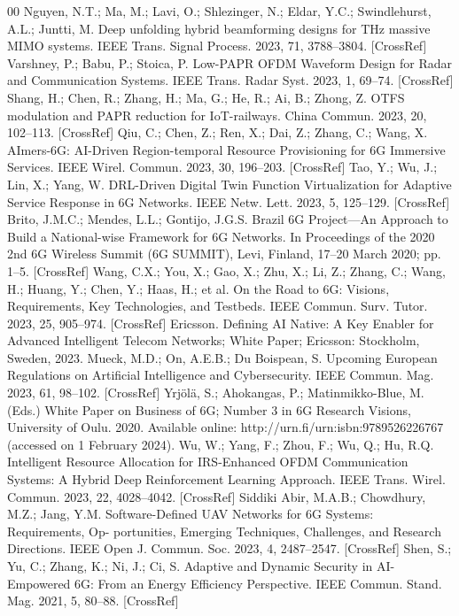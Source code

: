 \documentclass[conference]{IEEEtran}
\begin{document}
\begin{thebibliography}{00}
 Nguyen, N.T.; Ma, M.; Lavi, O.; Shlezinger, N.; Eldar, Y.C.; Swindlehurst, A.L.; Juntti, M. Deep unfolding hybrid beamforming designs for THz massive MIMO systems. IEEE Trans. Signal Process. 2023, 71, 3788–3804. [CrossRef]
 Varshney, P.; Babu, P.; Stoica, P. Low-PAPR OFDM Waveform Design for Radar and Communication Systems. IEEE Trans. Radar Syst. 2023, 1, 69–74. [CrossRef]
 Shang, H.; Chen, R.; Zhang, H.; Ma, G.; He, R.; Ai, B.; Zhong, Z. OTFS modulation and PAPR reduction for IoT-railways. China Commun. 2023, 20, 102–113. [CrossRef]
 Qiu, C.; Chen, Z.; Ren, X.; Dai, Z.; Zhang, C.; Wang, X. AImers-6G: AI-Driven Region-temporal Resource Provisioning for 6G Immersive Services. IEEE Wirel. Commun. 2023, 30, 196–203. [CrossRef]
 Tao, Y.; Wu, J.; Lin, X.; Yang, W. DRL-Driven Digital Twin Function Virtualization for Adaptive Service Response in 6G Networks. IEEE Netw. Lett. 2023, 5, 125–129. [CrossRef]
 Brito, J.M.C.; Mendes, L.L.; Gontijo, J.G.S. Brazil 6G Project—An Approach to Build a National-wise Framework for 6G Networks. In Proceedings of the 2020 2nd 6G Wireless Summit (6G SUMMIT), Levi, Finland, 17–20 March 2020; pp. 1–5. [CrossRef]
 Wang, C.X.; You, X.; Gao, X.; Zhu, X.; Li, Z.; Zhang, C.; Wang, H.; Huang, Y.; Chen, Y.; Haas, H.; et al. On the Road to 6G: Visions, Requirements, Key Technologies, and Testbeds. IEEE Commun. Surv. Tutor. 2023, 25, 905–974. [CrossRef]
 Ericsson. Defining AI Native: A Key Enabler for Advanced Intelligent Telecom Networks; White Paper; Ericsson: Stockholm, Sweden, 2023.
 Mueck, M.D.; On, A.E.B.; Du Boispean, S. Upcoming European Regulations on Artificial Intelligence and Cybersecurity. IEEE Commun. Mag. 2023, 61, 98–102. [CrossRef]
 Yrjölä, S.; Ahokangas, P.; Matinmikko-Blue, M. (Eds.) White Paper on Business of 6G; Number 3 in 6G Research Visions, University of Oulu. 2020. Available online: http://urn.fi/urn:isbn:9789526226767 (accessed on 1 February 2024).
 Wu, W.; Yang, F.; Zhou, F.; Wu, Q.; Hu, R.Q. Intelligent Resource Allocation for IRS-Enhanced OFDM Communication Systems: A Hybrid Deep Reinforcement Learning Approach. IEEE Trans. Wirel. Commun. 2023, 22, 4028–4042. [CrossRef]
 Siddiki Abir, M.A.B.; Chowdhury, M.Z.; Jang, Y.M. Software-Defined UAV Networks for 6G Systems: Requirements, Op- portunities, Emerging Techniques, Challenges, and Research Directions. IEEE Open J. Commun. Soc. 2023, 4, 2487–2547. [CrossRef]
 Shen, S.; Yu, C.; Zhang, K.; Ni, J.; Ci, S. Adaptive and Dynamic Security in AI-Empowered 6G: From an Energy Efficiency Perspective. IEEE Commun. Stand. Mag. 2021, 5, 80–88. [CrossRef]

\end{thebibliography}
\end{document}
